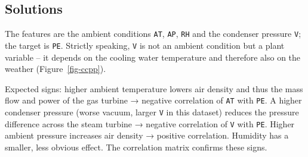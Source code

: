 \documentclass[
  letterpaper,
  DIV=11,
  numbers=noendperiod]{scrreprt}
\begin{document}
\subsection{Solutions}\label{solutions-1}

\begin{tcolorbox}[enhanced jigsaw, left=2mm, title=\textcolor{quarto-callout-caution-color}{\faFire}\hspace{0.5em}{Solution to Exercise 1}, opacityback=0, breakable, rightrule=.15mm, arc=.35mm, toptitle=1mm, colbacktitle=quarto-callout-caution-color!10!white, opacitybacktitle=0.6, coltitle=black, colframe=quarto-callout-caution-color-frame, bottomrule=.15mm, leftrule=.75mm, bottomtitle=1mm, titlerule=0mm, toprule=.15mm, colback=white]

The features are the ambient conditions \texttt{AT}, \texttt{AP},
\texttt{RH} and the condenser pressure \texttt{V}; the target is
\texttt{PE}. Strictly speaking, \texttt{V} is not an ambient condition
but a plant variable -- it depends on the cooling water temperature and
therefore also on the weather (Figure~\ref{fig-ccpp}).

Expected signs: higher ambient temperature lowers air density and thus
the mass flow and power of the gas turbine → negative correlation of
\texttt{AT} with \texttt{PE}. A higher condenser pressure (worse vacuum,
larger \texttt{V} in this dataset) reduces the pressure difference
across the steam turbine → negative correlation of \texttt{V} with
\texttt{PE}. Higher ambient pressure increases air density → positive
correlation. Humidity has a smaller, less obvious effect. The
correlation matrix confirms these signs.

\end{tcolorbox}
\end{document}
